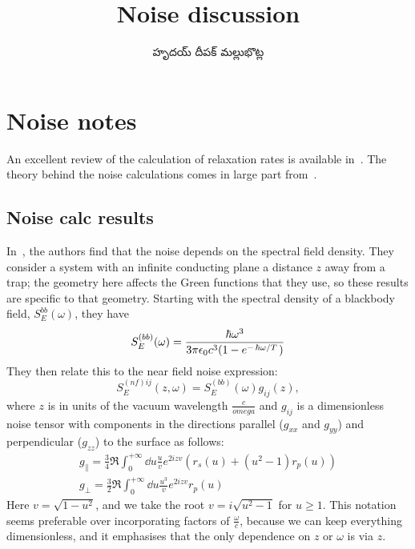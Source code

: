 \documentclass[../main.tex]{subfiles}
\title{Noise discussion}
\author{\begin{telugu}హృదయ్ దీపక్ మల్లుభొట్ల\end{telugu}}
\date{}
\begin{document}
	\graphicspath{{\main/figures/}}

	\onlyinsubfile{\maketitle}
	\section{Noise notes} \label{sec:NoiseCalc}
	An excellent review of the calculation of relaxation rates is available in~\cite{Henkel1999}.
	The theory behind the noise calculations comes in large part from~\cite{Agarwal1975}.

	\subsection{Noise calc results} \label{subsec:NoiseCalcResults}
	In~\cite{Henkel1999}, the authors find that the noise depends on the spectral field density.
	They consider a system with an infinite conducting plane a distance $z$ away from a trap;
	the geometry here affects the Green functions that they use, so these results are specific to that geometry.
	Starting with the spectral density of a blackbody field, $S^{bb}_E(\omega)$, they have
	\begin{equation}
		S^{(bb)}_E(\omega) = \frac{\hbar \omega^3}{3 \pi \epsilon_0 c^3 (1 - e^{-\flatfrac{\hbar \omega}{T}})}
	\end{equation}
	They then relate this to the near field noise expression:
	\begin{equation}
		S^{(nf)ij}_E(z, \omega) = S^{(bb)}_E(\omega) g_{ij}(z),
	\end{equation}
	where $z$ is in units of the vacuum wavelength $\frac{c}{omega}$ and $g_{ij}$ is a dimensionless noise tensor with components in the directions parallel ($g_{xx}$ and $g_{yy}$) and perpendicular ($g_{zz}$) to the surface as follows:
	\begin{gather}
		g_\parallel = \frac34 \Re \int_0^{+\infty} \dd{u} \frac{u}{v} e^{2i z v} \left(r_s(u) + \left(u^2 - 1\right) r_p(u) \right) \\
		g_\perp = \frac32 \Re \int_0^{+\infty} \dd{u} \frac{u^3}{v} e^{2 i z v} r_p(u)
	\end{gather}
	Here $v = \sqrt{1 - u^2}$, and we take the root $v = i \sqrt{u^2 - 1}$ for $u \geq 1$.
	This notation seems preferable over incorporating factors of $\frac{\omega}{c}$, because we can keep everything dimensionless, and it emphasises that the only dependence on $z$ or $\omega$ is via $z$.
\end{document}
